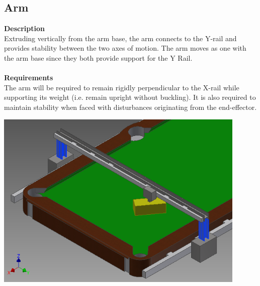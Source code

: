 \documentclass[titlepage]{article}
\begin{document}
\begin{center}
\begin{center}
\begin{center}
\begin{center}
\begin{center}
\begin{center}
\begin{center}
\begin{center}

\newpage
\subsection{Arm}
\textbf{Description}\\
Extruding vertically from the arm base, the arm connects to the Y-rail and provides stability between the two axes of motion. The arm moves as one with the arm base since they both provide support for the Y Rail.\\\\
\textbf{Requirements}\\
The arm will be required to remain rigidly perpendicular to the X-rail while supporting its weight (i.e. remain upright without buckling). It is also required to maintain stability when faced with disturbances originating from the end-effector.
\begin{center}
	\includegraphics[width = 0.9\textwidth]{arms.png}	%
\label{fig:armFig}
\end{center}




\end{center}
\end{center}
\end{center}
\end{center}
\end{center}
\end{center}
\end{center}
\end{center}
\end{document}
